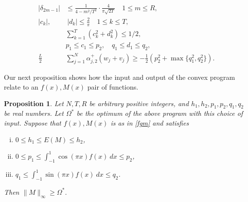 \documentclass[12pt]{article}
\newtheorem{prop}[theorem]{Proposition}
\numberwithin{equation}{section}
\begin{document}
\begin{align}
  | \delta_{2m-1} | & \leq \frac{1}{4-m^2/T^2}\cdot \frac{4}{\pi\sqrt{2T}} \quad 1 \leq m \leq R,\label{fulldel}\\
  |c_k |, & \ |d_k|  \leq \frac{2}{\pi} \quad 1 \leq k \leq T, \label{fullckdk}\\
&  \sum_{k=1}^T  (c_k^2+d_k^2) \leq 1/2 ,\label{fullpars} \\
   & p_1 \leq c_1 \leq p_2, \quad q_1 \leq d_1 \leq q_2,\label{fullc1d1} \\
      \frac{L}{2}&\sum_{j=1}^{N} \alpha_{j,2}^+(w_j+v_j) \geq - \frac{1}{2}(p_2^2+\max\{q_1^2,q_2^2\}).\label{fullA1} 
\end{align}




Our next proposition shows how the input and output of the convex program relate to an $f(x),M(x)$ pair of functions.


\begin{prop}\label{convexprop} Let $N,T,R$ be arbitrary positive integers, and $h_1,h_2,p_1,p_2,q_1,q_2$ be real numbers. Let $\Omega^*$ be the optimum of the above program with this choice of input. Suppose that $f(x),M(x)$ is as in \eqref{fgm} and satisfies 
\begin{enumerate}[(i)]
\item $0 \leq h_1\leq E(M) \leq h_2$,
\item $0 \leq p_1 \leq \int_{-1}^1 \cos(\pi x) f(x) \ dx \leq p_2$,
\item $q_1 \leq \int_{-1}^1 \sin(\pi x) f(x) \ dx \leq q_2$.
\end{enumerate}
Then $\|M\|_{\infty} \geq \Omega^*$.
\end{prop} 
\end{document}
